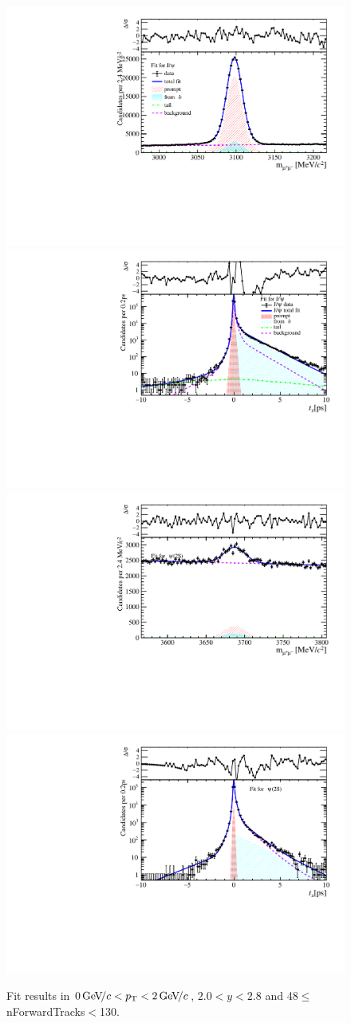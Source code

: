 \begin{figure}[H]
\begin{center}
\includegraphics[width=0.47\linewidth]{pdf/Jpsi/drawmassF/n5y1pt1.pdf}
\includegraphics[width=0.47\linewidth]{pdf/Jpsi/2DFitF/n5y1pt1.pdf}
\vspace*{-0.5cm}
\includegraphics[width=0.47\linewidth]{pdf/Psi2S/drawmassF/n5y1pt1.pdf}
\includegraphics[width=0.47\linewidth]{pdf/Psi2S/2DFitF/n5y1pt1.pdf}
\vspace*{-0.5cm}
\end{center}
\caption{Fit results in $0\text{\,Ge\kern -0.1em V\!/}c<p_{\mathrm{T}}<2\text{\,Ge\kern -0.1em V\!/}c$, $2.0<y<2.8$ and 48$\leq$nForwardTracks$<$130.}
\label{Fitn5y1pt1}
\end{figure}
